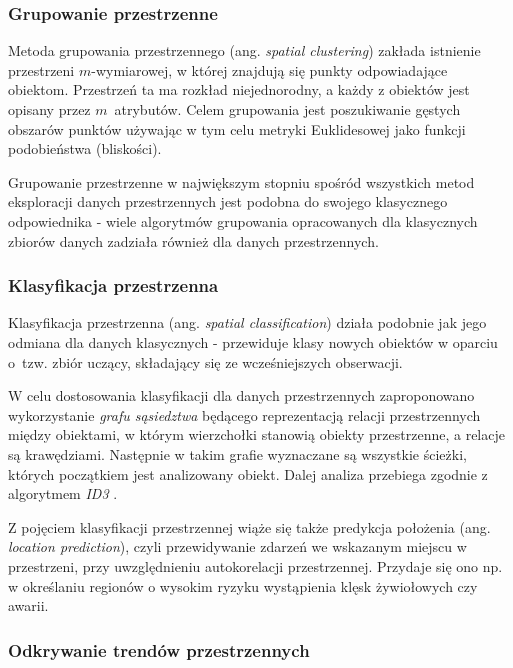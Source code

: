 \documentclass[12pt]{article}
\begin{document}
\subsubsection{Grupowanie przestrzenne}

Metoda grupowania przestrzennego (ang. \textit{spatial clustering}) zakłada istnienie przestrzeni $m$-wymiarowej, w której znajdują się punkty odpowiadające obiektom. Przestrzeń ta ma rozkład niejednorodny, a każdy z obiektów jest opisany przez $m$~atrybutów. Celem grupowania jest poszukiwanie gęstych obszarów punktów używając w tym celu metryki Euklidesowej jako funkcji podobieństwa (bliskości). 

Grupowanie przestrzenne w największym stopniu spośród wszystkich metod eksploracji danych przestrzennych jest podobna do swojego klasycznego odpowiednika - wiele algorytmów grupowania opracowanych dla klasycznych zbiorów danych zadziała również dla danych przestrzennych. 

\subsubsection{Klasyfikacja przestrzenna}

Klasyfikacja przestrzenna (ang. \textit{spatial classification}) działa podobnie jak jego odmiana dla danych klasycznych - przewiduje klasy nowych obiektów w oparciu o~tzw. zbiór uczący, składający się ze wcześniejszych obserwacji.

W celu dostosowania klasyfikacji dla danych przestrzennych zaproponowano \cite{klasyfikacja} wykorzystanie \textit{grafu sąsiedztwa} będącego reprezentacją relacji przestrzennych między obiektami, w którym wierzchołki stanowią obiekty przestrzenne, a relacje są krawędziami. Następnie w takim grafie wyznaczane są wszystkie ścieżki, których początkiem jest analizowany obiekt. Dalej analiza przebiega zgodnie z algorytmem \textit{ID3} \cite{id3}.

Z pojęciem klasyfikacji przestrzennej wiąże się także predykcja położenia (ang. \textit{location prediction}), czyli przewidywanie zdarzeń we wskazanym miejscu w przestrzeni, przy uwzględnieniu autokorelacji przestrzennej. Przydaje się ono np. w określaniu regionów o wysokim ryzyku wystąpienia klęsk żywiołowych czy awarii.

\subsubsection{Odkrywanie trendów przestrzennych}
\end{document}
